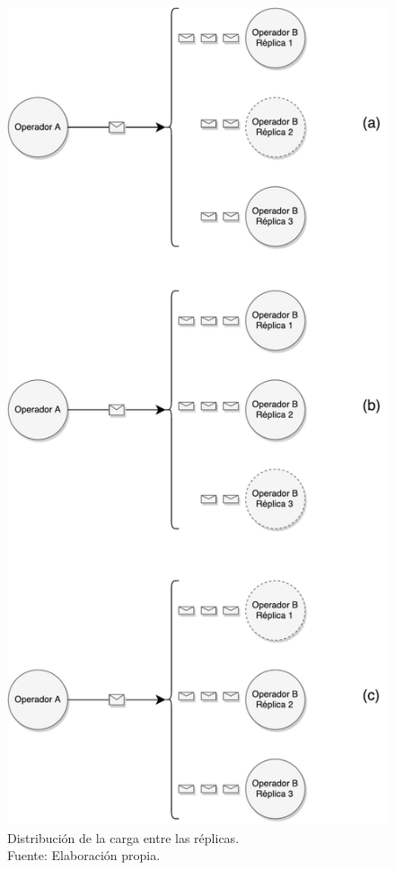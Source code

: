 \begin{figure}[!ht]
	\includegraphics[scale=0.4]{images/DistribucionCarga.pdf}
	\caption[Distribución de la carga entre las réplicas.]{Distribución de la carga entre las réplicas.\\Fuente: Elaboración propia.}
	\label{fig:distCarga}
\end{figure}

